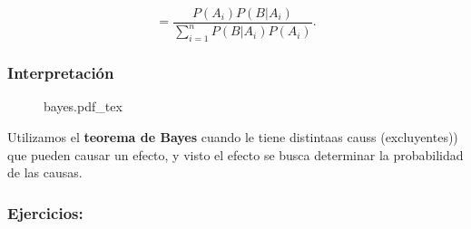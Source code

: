 \documentclass[a4paper]{book}
\newcommand{\incfig}[2][0.7]{%
    \def\svgwidth{#1\columnwidth}
    {#2.pdf_tex}
}
\begin{document}
\[
= \frac{P\left(A_{i}\right)P\left(B|A_{i}\right)}{\sum_{i=1}^{n}P\left(B|A_{i}\right)P\left(A_{i}\right) }
.\]

\subsubsection{Interpretación}

\begin{figure}[pbth!]
    \centering
    \incfig{bayes}
\end{figure}


Utilizamos el \textbf{teorema de Bayes} cuando le tiene distintaas causs
(excluyentes)) que pueden causar un efecto, y visto el efecto se busca
determinar la probabilidad de las causas.

\subsubsection{Ejercicios:}
\end{document}
